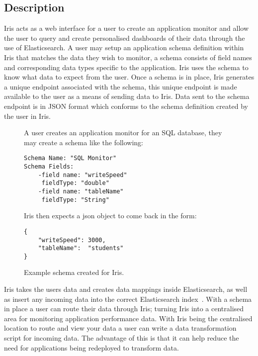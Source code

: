 \documentclass[12pt,a4paper,titlepage]{report}
\begin{document}
\subsection{Description}
Iris acts as a web interface for a user to create an application monitor and allow the user to query and create personalised dashboards of their data through the use of Elasticsearch. A user may setup an application schema definition within Iris that matches the data they wish to monitor, a schema consists of field names and corresponding data types specific to the application. Iris uses the schema to know what data to expect from the user. Once a schema is in place, Iris generates a unique endpoint associated with the schema, this unique endpoint is made available to the user as a means of sending data to Iris. Data sent to the schema endpoint is in JSON format which conforms to the schema definition created by the user in Iris.
\begin{figure}[H]
\begin{tcolorbox}
A user creates an application monitor for an SQL database, they may create a schema like the following:
\begin{verbatim}
Schema Name: "SQL Monitor"
Schema Fields:
    -field name: "writeSpeed"
     fieldType: "double"
    -field name: "tableName"
     fieldType: "String"
\end{verbatim}
Iris then expects a json object to come back in the form:
\begin{verbatim}
{
	"writeSpeed": 3000,
	"tableName":  "students"
}
\end{verbatim}
\end{tcolorbox}
\caption{Example schema created for Iris.}
\end{figure}

Iris takes the users data and creates data mappings \parencite{Elastic.co.Mapping} inside Elasticsearch, as well as insert any incoming data into the correct Elasticsearch index~\parencite{Elastic.co.Basic}. With a schema in place a user can route their data through Iris; turning Iris into a centralised area for monitoring application performance data. With Iris being the centralised location to route and view your data a user can write a data transformation script for incoming data. The advantage of this is that it can help reduce the need for applications being redeployed to transform data.
\end{document}
